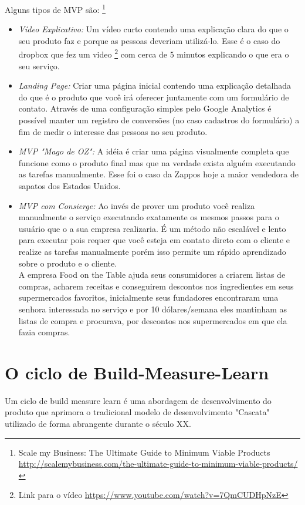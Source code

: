     \par Alguns tipos de MVP são: \footnote{ Scale my Business: The Ultimate Guide to Minimum Viable Products  \url{http://scalemybusiness.com/the-ultimate-guide-to-minimum-viable-products/}}
\begin{itemize}
\item \emph{ Vídeo Explicativo:}
Um vídeo curto contendo uma explicação clara do que o seu produto faz e porque as pessoas deveriam utilizá-lo. Esse é o caso do dropbox que fez um video \footnote{Link para o vídeo   \url{https://www.youtube.com/watch?v=7QmCUDHpNzE}} com cerca de 5 minutos explicando o que era o seu serviço.
\item \emph{Landing Page:}
Criar uma página inicial contendo uma explicação detalhada do que é o produto que você irá oferecer juntamente com um formulário de contato. Através de uma configuração simples pelo Google Analytics é possível manter um registro de conversões (no caso cadastros do formulário)  a fim de medir o interesse das pessoas no seu produto.
\item \emph{MVP "Mago de OZ":}
A idéia é criar uma página visualmente completa que funcione como o produto final mas que na verdade  exista alguém  executando as tarefas manualmente. Esse foi o caso da Zappos hoje a maior vendedora de sapatos dos Estados Unidos.
\item \emph{ MVP com Consierge:}
Ao invés de prover um produto você realiza manualmente o serviço executando
exatamente os mesmos passos para o usuário que o a sua empresa realizaria. É um método não escalável e lento para executar pois requer que você esteja em contato direto com o cliente e realize as tarefas manualmente porém isso permite um rápido aprendizado sobre o produto e o cliente.
\\A empresa Food on the Table ajuda seus consumidores a criarem listas de compras, acharem receitas e conseguirem descontos nos ingredientes em seus supermercados favoritos, inicialmente seus fundadores encontraram uma senhora interessada no serviço e por 10 dólares/semana eles mantinham as listas de compra e procurava, por descontos nos supermercados em que ela fazia  compras.
\end{itemize}

\section{O ciclo de Build-Measure-Learn}

    \par Um ciclo de build measure learn é uma abordagem de desenvolvimento do produto que aprimora  o tradicional modelo de desenvolvimento "Cascata" utilizado de forma abrangente durante o século XX.
